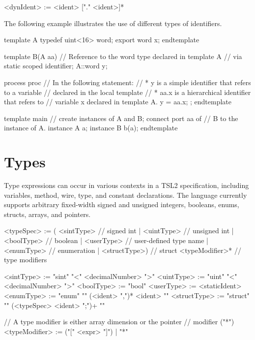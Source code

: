 \documentclass{report}
\newcommand{\tsl}{TSL2 }
\begin{document}
\begin{bnflisting}{}
<dynIdent> := <ident> ["." <ident>]*
\end{bnflisting}

The following example illustrates the use of different types of 
identifiers.

\begin{tsllisting}{}
template A
  typedef uint<16> word;
  export word x;
endtemplate
    
template B(A aa)
  // Reference to the word type declared in template A
  // via static scoped identifier;
  A::word y;

  process proc {
    // In the following statement:
    // * y is a simple identifier that refers to a variable
    //   declared in the local template
    // * aa.x is a hierarchical identifier that refers to
    //   variable x declared in template A.
    y = aa.x;
  };
endtemplate

template main
  // create instances of A and B; connect port aa of
  // B to the instance of A.
  instance A a;
  instance B b(a);
endtemplate
\end{tsllisting}


\section{Types}

Type expressions can occur in various contexts in a \tsl 
specification, including variables, method, wire, type, and 
constant declarations.  The language currently supports arbitrary 
fixed-width signed and unsigned integers, booleans, enums, 
structs, arrays, and pointers.

\begin{bnflisting}{}
<typeSpec>   := ( <sintType>    // signed int
                | <uintType>    // unsigned int
                | <boolType>    // boolean
                | <userType>    // user-defined type name
                | <enumType>    // enumeration
                | <structType>) // struct
                <typeModifier>* // type modifiers

<sintType>   := "sint" "<" <decimalNumber> ">"
<uintType>   := "uint" "<" <decimalNumber> ">"
<boolType>   := "bool"
<userType>   := <staticIdent>
<enumType>   := "enum" "{" (<ident> ",")*  <ident> "}"
<structType> := "struct" "{" (<typeSpec> <ident> ";")+ "}"

// A type modifier is either array dimension or the pointer
// modifier ("*")
<typeModifier> := ("[" <expr> "]")
                | "*"
\end{bnflisting}
\end{document}

